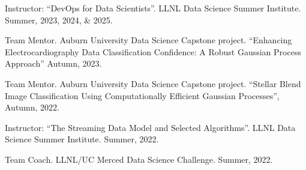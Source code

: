 \begin{innerlist}
  \item[-] Instructor: ``DevOps for Data Scientists''.
  LLNL Data Science Summer Institute.
  Summer, 2023, 2024, \& 2025.

  \item[-] Team Mentor.
  Auburn University Data Science Capstone project.
  ``Enhancing Electrocardiography Data Classification Confidence: A Robust Gaussian Process Approach''
  Autumn, 2023.

  \item[-] Team Mentor.
  Auburn University Data Science Capstone project.
  ``Stellar Blend Image Classification Using Computationally Efficient Gaussian Processes'',
  Autumn, 2022.

  \item[-] Instructor: ``The Streaming Data Model and Selected Algorithms''.
  LLNL Data Science Summer Institute.
  Summer, 2022.

  \item[-] Team Coach.
  LLNL/UC Merced Data Science Challenge.
  Summer, 2022.

\end{innerlist}